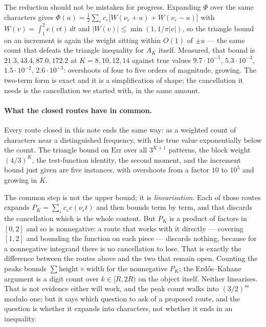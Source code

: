 \documentclass[11pt]{article}
\theoremstyle{remark}
\newcommand{\eps}{\varepsilon}
\begin{document}
The reduction should not be mistaken for progress. Expanding $\Phi$ over the same characters gives
$\Phi(u)=\tfrac12\sum_\eps c_\eps\bigl[W(\nu_\eps+u)+W(\nu_\eps-u)\bigr]$ with
$W(v)=\int_1^2e(vt)\,dt$ and $|W(v)|\le\min(1,1/\pi|v|)$, so the triangle bound on an increment is again
the weight sitting within $O(1)$ of $\pm u$ --- the same count that defeats the triangle inequality for
$A_K$ itself. Measured, that bound is $21.3,43.4,87.0,172.2$ at $K=8,10,12,14$ against true values
$9.7\cdot10^{-5}$, $5.3\cdot10^{-3}$, $1.5\cdot10^{-2}$, $2.6\cdot10^{-3}$: overshoots of four to five
orders of magnitude, growing. The two-term form is exact and it is a simplification of shape; the
cancellation it needs is the cancellation we started with, in the same amount.

\paragraph{What the closed routes have in common.} Every route closed in this note ends the same way: as
a weighted count of characters near a distinguished frequency, with the true value exponentially below
the count. The triangle bound on $\mathrm{Err}$ over all $3^{K+1}$ patterns, the block weight $(4/3)^K$,
the test-function identity, the second moment, and the increment bound just given are five instances,
with overshoots from a factor $10$ to $10^5$ and growing in $K$.

The common step is not the upper bound; it is \emph{linearisation}. Each of those routes expands
$P_K=\sum_\eps c_\eps e(\nu_\eps t)$ and then bounds term by term, and that discards the cancellation
which is the whole content. But $P_K$ is a product of factors in $[0,2]$ and so is nonnegative: a route
that works with it directly --- covering $[1,2]$ and bounding the function on each piece --- discards
nothing, because for a nonnegative integrand there is no cancellation to lose. That is exactly the
difference between the routes above and the two that remain open. Counting the peaks bounds
$\sum\text{height}\times\text{width}$ for the nonnegative $P_K$; the Erd\H{o}s--Kahane argument is a digit
count over $k\in[R,2R)$ on the object itself. Neither linearises. That is not evidence either will work,
and the peak count walks into $(3/2)^m$ modulo one; but it says which question to ask of a proposed
route, and the question is whether it expands into characters, not whether it ends in an inequality.
\end{document}
